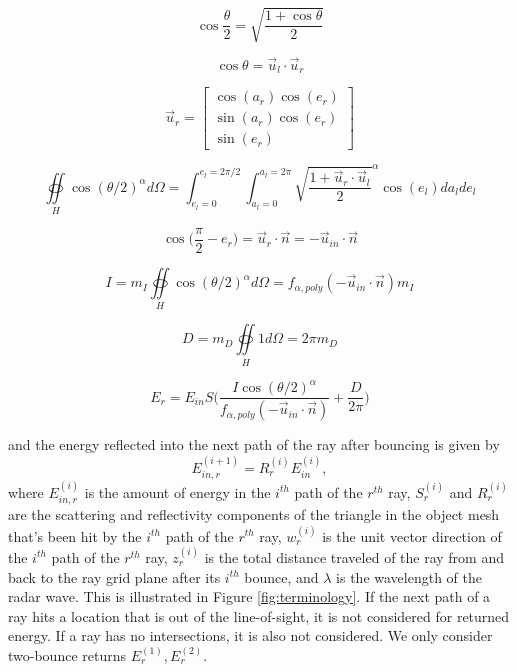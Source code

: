 \documentclass[onecolumn]{IEEEtran}
\begin{document}
\begin{equation}
    \cos\frac{\theta}{2} = \sqrt{\frac{1+\cos \theta}{2}}
\end{equation}

\begin{equation}
    \cos\theta = \vec{u}_{l}\cdot \vec{u}_{r}
\end{equation}

\begin{equation}
    \vec{u}_r = 
        \begin{bmatrix}
            \cos(a_r)\cos(e_r) \\
            \sin(a_r)\cos(e_r) \\
            \sin(e_r)
        \end{bmatrix}
\end{equation}

\begin{equation}
    \oiint\limits_{H} \cos({\theta/2})^\alpha d \Omega = \int_{e_l=0}^{e_l=2 \pi/2}\int_{a_l=0}^{a_l=2 \pi}\sqrt{\frac{1+\vec{u}_r \cdot \vec{u}_l}{2}}^\alpha \cos(e_l) da_lde_l
\end{equation}

\begin{equation}
    \cos\bigg(\frac{\pi}{2}-e_r\bigg) = \vec{u}_r \cdot \vec{n}  = -\vec{u}_{in} \cdot \vec{n}
\end{equation}

\begin{equation}
    I = m_I \oiint\limits_{H} \cos({\theta/2})^\alpha d \Omega = f_{\alpha,poly}(-\vec{u}_{in} \cdot \vec{n})m_I
\end{equation}

\begin{equation}
    D =  m_D \oiint\limits_{H} 1 d \Omega = 2 \pi m_D
\end{equation}

\begin{equation}
    E_r = E_{in} S \Bigg(\frac{I \cos({\theta/2})^\alpha}{f_{\alpha,poly}(-\vec{u}_{in} \cdot \vec{n})} + \frac{D}{2\pi}\Bigg)
\end{equation}

and the energy reflected into the next path of the ray after bouncing is given by
\begin{equation}
    E^{(i+1)}_{in,r} = R_r^{(i)}E^{(i)}_{in}
    ,
    \label{eq:reflected-energy}
\end{equation}
where $E_{in,r}^{(i)}$ is the amount of energy in the $i^{th}$ path of the $r^{th}$ ray, $S_r^{(i)}$ and $R_r^{(i)}$ are the scattering and reflectivity components of the triangle in the object mesh that's been hit by the $i^{th}$ path of the $r^{th}$ ray, $w_{r}^{(i)}$ is the unit vector direction of the $i^{th}$ path of the $r^{th}$ ray, $z_r^{(i)}$ is the total distance traveled of the ray from and back to the ray grid plane after its $i^{th}$ bounce, and $\lambda$ is the wavelength of the radar wave. This is illustrated in Figure \ref{fig:terminology}.
If the next path of a ray hits a location that is out of the line-of-sight, it is not considered for returned energy. If a ray has no intersections, it is also not considered. We only consider two-bounce returns $E_r^{(1)},E_r^{(2)}$.
\end{document}
